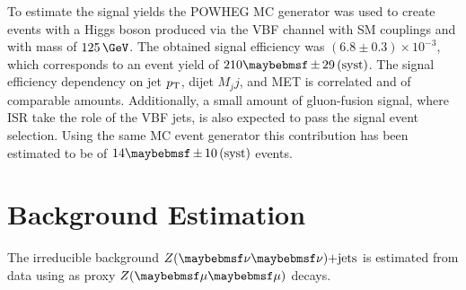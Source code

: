 To estimate the signal yields the \textsc{POWHEG} \gls{MC} generator was used to create events with a Higgs boson produced via the \gls{VBF} channel with \gls{SM} couplings and with mass of $125\,\GeV$. The obtained signal efficiency was $(6.8 \pm 0.3) \times 10^{-3}$, which corresponds to an event yield of $210 \pm 29\syst$. The signal efficiency dependency on jet $p_{\mathrm{T}}$, dijet $M_jj$, and \gls{MET} is correlated and of comparable amounts. Additionally, a small amount of gluon-fusion signal, where \gls{ISR} take the role of the \gls{VBF} jets, is also expected to pass the signal event selection. Using the same \gls{MC} event generator this contribution has been estimated to be of $14 \pm 10\syst$ events.

\section{Background Estimation}


The irreducible background $\Z(\nu \nu)\text{+jets}$ is estimated from data using as proxy $\Z (\mu \mu)$ decays. 



% 

